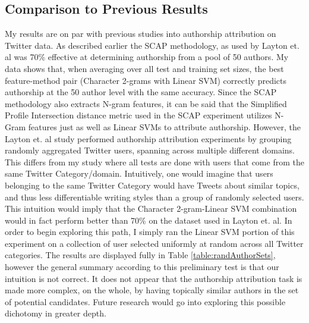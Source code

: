 \documentclass[pageno]{jpaper}
\begin{document}
\subsection{Comparison to Previous Results}
\label{sec:comparison}
My results are on par with previous studies into authorship attribution on Twitter data.  As described earlier the SCAP methodology, as used by Layton et. al was 70\% effective at determining authorship from a pool of 50 authors.  My data shows that, when averaging over all test and training set sizes, the best feature-method pair (Character 2-grams with Linear SVM) correctly predicts authorship at the 50 author level with the same accuracy.  Since the SCAP methodology also extracts N-gram features, it can be said that the Simplified Profile Intersection distance metric used in the SCAP experiment utilizes N-Gram features just as well as Linear SVMs to attribute authorship.  However, the Layton et. al study performed authorship attribution experiments by grouping randomly aggregated Twitter users, spanning across multiple different domains.  This differs from my study where all tests are done with users that come from the same Twitter Category/domain.  Intuitively, one would imagine that users belonging to the same Twitter Category would have  Tweets about similar topics, and thus less differentiable writing styles than a group of randomly selected users.  This intuition would imply that the Character 2-gram-Linear SVM combination would in fact perform better than 70\% on the dataset used in Layton et. al.  In order to begin exploring this path, I simply ran the Linear SVM portion of this experiment on a collection of user selected uniformly at random across all Twitter categories.  The results are displayed fully in Table \ref{table:randAuthorSets}, however the general summary according to this preliminary test is that our intuition is not correct.  It does not appear that the authorship attribution task is made more complex, on the whole, by having topically similar authors in the set of potential candidates.  Future research would go into exploring this possible dichotomy in greater depth.
\end{document}
